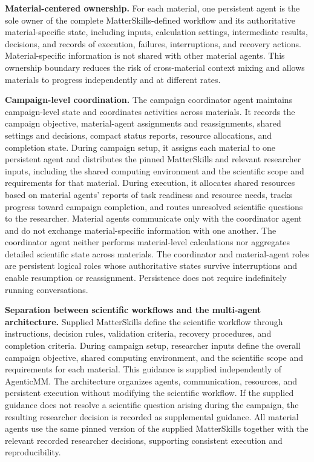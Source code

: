 \documentclass[aip,jap,reprint]{revtex4-2}
\begin{document}
\noindent\textbf{Material-centered ownership.} For each material, one persistent agent is the sole owner of the complete MatterSkills-defined workflow and its authoritative material-specific state, including inputs, calculation settings, intermediate results, decisions, and records of execution, failures, interruptions, and recovery actions. Material-specific information is not shared with other material agents. This ownership boundary reduces the risk of cross-material context mixing and allows materials to progress independently and at different rates.

\noindent\textbf{Campaign-level coordination.} The campaign coordinator agent maintains campaign-level state and coordinates activities across materials. It records the campaign objective, material-agent assignments and reassignments, shared settings and decisions, compact status reports, resource allocations, and completion state. During campaign setup, it assigns each material to one persistent agent and distributes the pinned MatterSkills and relevant researcher inputs, including the shared computing environment and the scientific scope and requirements for that material. During execution, it allocates shared resources based on material agents' reports of task readiness and resource needs, tracks progress toward campaign completion, and routes unresolved scientific questions to the researcher. Material agents communicate only with the coordinator agent and do not exchange material-specific information with one another. The coordinator agent neither performs material-level calculations nor aggregates detailed scientific state across materials. The coordinator and material-agent roles are persistent logical roles whose authoritative states survive interruptions and enable resumption or reassignment. Persistence does not require indefinitely running conversations.

\noindent\textbf{Separation between scientific workflows and the multi-agent architecture.} Supplied MatterSkills define the scientific workflow through instructions, decision rules, validation criteria, recovery procedures, and completion criteria. During campaign setup, researcher inputs define the overall campaign objective, shared computing environment, and the scientific scope and requirements for each material. This guidance is supplied independently of AgenticMM. The architecture organizes agents, communication, resources, and persistent execution without modifying the scientific workflow. If the supplied guidance does not resolve a scientific question arising during the campaign, the resulting researcher decision is recorded as supplemental guidance. All material agents use the same pinned version of the supplied MatterSkills together with the relevant recorded researcher decisions, supporting consistent execution and reproducibility.
\end{document}
